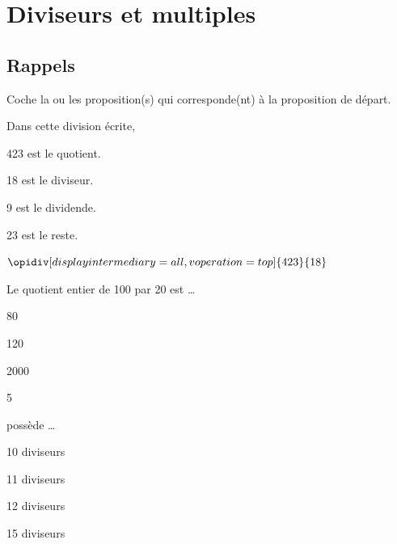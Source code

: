 \documentclass[../math2.tex]{subfiles}
\begin{document}
\chapter{Diviseurs et multiples}

\section{Rappels}

Coche la ou les proposition(s) qui corresponde(nt) à la proposition de départ.

\begin{tasks}
    \task Dans cette division écrite,

    \begin{minipage}{.7\linewidth}
        \begin{enumerate}[cols=2, label={\faIcon[regular]{square}}]
            \item 423 est le quotient.
            \item 18 est le diviseur.
            \item 9 est le dividende.
            \item 23 est le reste.
        \end{enumerate}
    \end{minipage}
    \hfill
    \begin{minipage}{.2\linewidth}
        $\opidiv[displayintermediary=all,voperation=top]{423}{18}$
    \end{minipage}


    \task Le quotient entier de 100 par 20 est \dots
    \begin{enumerate}[cols=4, label={\faIcon[regular]{square}}]
        \item 80
        \item 120
        \item 2000
        \item 5
    \end{enumerate}

     possède \dots
    \begin{enumerate}[cols=4, label={\faIcon[regular]{square}}]
        \item 10 diviseurs
        \item 11 diviseurs
        \item 12 diviseurs
        \item 15 diviseurs
    \end{enumerate}


\end{tasks}
\end{document}
